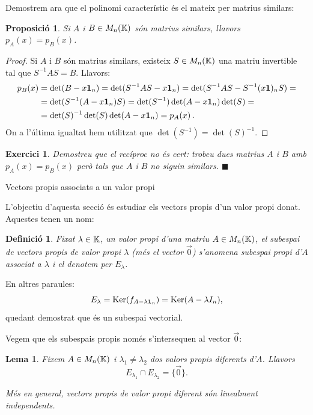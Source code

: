 \documentclass[
  11pt,
]{book}
\makeatletter
\numberwithin{dummy}{section}
\theoremstyle{maincolornumbox}
\newtheorem{exerciseT}{Exercici}[chapter]
\theoremstyle{blacknumex}
\theoremstyle{blacknumbox}
\newtheorem{definitionT}{Definició}[chapter]
\theoremstyle{maincolornum}
\newtheorem{propositionT}{Proposició}[chapter]
\newtheorem{lemmaT}{Lema}[chapter]
\newenvironment{proposition}{\begin{pBox}\begin{propositionT}}{\end{propositionT}\end{pBox}}
\newenvironment{lemma}{\begin{pBox}\begin{lemmaT}}{\end{lemmaT}\end{pBox}}
\newenvironment{exercise}{\begin{eBox}\begin{exerciseT}}{\hfill{\color{maincolor}\tiny\ensuremath{\blacksquare}}\end{exerciseT}\end{eBox}}
\newenvironment{definition}{\begin{dBox}\begin{definitionT}}{\end{definitionT}\end{dBox}}
\renewcommand{\section}{\@startsection{section}{1}{\z@}
{-4ex \@plus -1ex \@minus -.4ex}
{1ex \@plus.2ex }
{\normalfont\large\sffamily\bfseries}}
\newlength\esp
\makeatother
\begin{document}
Demostrem ara que el polinomi característic és el mateix per matrius
similars:

\begin{proposition}
Si \(A\) i \(B\in M_n(\mathbb{K})\) són matrius similars, llavors \(p_A(x)=p_B(x)\).
\end{proposition}

\begin{proof}
Si \(A\) i \(B\) són matrius similars, existeix \(S\in M_n(\mathbb{K})\) una
matriu invertible tal que \(S^{-1}AS=B\). Llavors: \begin{align*}
p_B(x) & =\det(B-x\mathbf{1}_n)=\det(S^{-1}AS-x\mathbf{1}_n)=\det(S^{-1}AS-S^{-1}(x\mathbf{1})_nS)=\\ & = \det(S^{-1}(A-x\mathbf{1}_n)S)= \det(S^{-1})\det(A-x\mathbf{1}_n)\det(S)=\\
 & = \det(S)^{-1}\det(S)\det(A-x\mathbf{1}_n) = p_A(x) \, .
\end{align*} On a l'última igualtat hem utilitzat que
\(\det(S^{-1})=\det(S)^{-1}\).
\end{proof}

\begin{exercise}
Demostreu que el recíproc no és cert: trobeu dues matrius \(A\) i \(B\) amb
\(p_A(x)=p_B(x)\) però tals que \(A\) i \(B\) no siguin similars.
\end{exercise}

\hypertarget{vectors-propis-associats-a-un-valor-propi}{%
\section{Vectors propis associats a un valor propi}\label{vectors-propis-associats-a-un-valor-propi}}

L'objectiu d'aquesta secció és estudiar els vectors propis d'un valor
propi donat. Aquestes tenen un nom:

\begin{definition}
Fixat \(\lambda\in\mathbb{K}\), un valor propi d'una matriu \(A\in M_n(\mathbb{K})\), el
subespai de vectors propis de valor propi \(\lambda\) (més el vector
\(\vec 0\)) s'anomena \emph{subespai propi d'\(A\) associat a \(\lambda\)} i el
denotem per \(E_\lambda\).
\end{definition}

En altres paraules:
\[E_\lambda=\operatorname{Ker}(f_{A-\lambda\mathbf{1}_n})=\operatorname{Ker}(A-\lambda I_n) ,\] quedant
demostrat que és un subespai vectorial.

Vegem que els subespais propis només s'intersequen al vector \(\vec 0\):

\begin{lemma}
\protect\hypertarget{lem:veps-vap-dif-LI}{}\label{lem:veps-vap-dif-LI}Fixem
\(A\in M_n(\mathbb{K})\) i \(\lambda_1\neq\lambda_2\) dos valors propis diferents
d'\(A\). Llavors \[E_{\lambda_1}\cap E_{\lambda_2}=\{\vec 0\}.\]

Més en general, vectors propis de valor propi diferent són linealment
independents.
\end{lemma}
\end{document}
